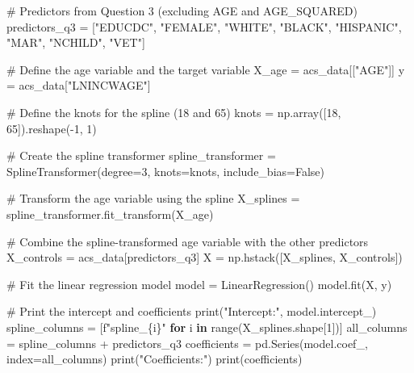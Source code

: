 \documentclass[
  11pt,
  letterpaper,
  DIV=11,
  numbers=noendperiod]{scrartcl}
\newenvironment{Shaded}{\begin{snugshade}}{\end{snugshade}}
\newcommand{\BuiltInTok}[1]{\textcolor[rgb]{0.00,0.23,0.31}{#1}}
\newcommand{\CommentTok}[1]{\textcolor[rgb]{0.37,0.37,0.37}{#1}}
\newcommand{\ControlFlowTok}[1]{\textcolor[rgb]{0.00,0.23,0.31}{\textbf{#1}}}
\newcommand{\DecValTok}[1]{\textcolor[rgb]{0.68,0.00,0.00}{#1}}
\newcommand{\KeywordTok}[1]{\textcolor[rgb]{0.00,0.23,0.31}{\textbf{#1}}}
\newcommand{\NormalTok}[1]{\textcolor[rgb]{0.00,0.23,0.31}{#1}}
\newcommand{\OperatorTok}[1]{\textcolor[rgb]{0.37,0.37,0.37}{#1}}
\newcommand{\SpecialCharTok}[1]{\textcolor[rgb]{0.37,0.37,0.37}{#1}}
\newcommand{\SpecialStringTok}[1]{\textcolor[rgb]{0.13,0.47,0.30}{#1}}
\newcommand{\StringTok}[1]{\textcolor[rgb]{0.13,0.47,0.30}{#1}}
\newcommand{\VariableTok}[1]{\textcolor[rgb]{0.07,0.07,0.07}{#1}}
\begin{document}
\begin{Shaded}
\begin{Highlighting}[]
\CommentTok{\# Predictors from Question 3 (excluding AGE and AGE\_SQUARED)}
\NormalTok{predictors\_q3 }\OperatorTok{=}\NormalTok{ [}\StringTok{"EDUCDC"}\NormalTok{, }\StringTok{"FEMALE"}\NormalTok{, }\StringTok{"WHITE"}\NormalTok{, }\StringTok{"BLACK"}\NormalTok{, }\StringTok{"HISPANIC"}\NormalTok{, }
                 \StringTok{"MAR"}\NormalTok{, }\StringTok{"NCHILD"}\NormalTok{, }\StringTok{"VET"}\NormalTok{]}

\CommentTok{\# Define the age variable and the target variable}
\NormalTok{X\_age }\OperatorTok{=}\NormalTok{ acs\_data[[}\StringTok{"AGE"}\NormalTok{]]}
\NormalTok{y }\OperatorTok{=}\NormalTok{ acs\_data[}\StringTok{"LNINCWAGE"}\NormalTok{]}

\CommentTok{\# Define the knots for the spline (18 and 65)}
\NormalTok{knots }\OperatorTok{=}\NormalTok{ np.array([}\DecValTok{18}\NormalTok{, }\DecValTok{65}\NormalTok{]).reshape(}\OperatorTok{{-}}\DecValTok{1}\NormalTok{, }\DecValTok{1}\NormalTok{)}

\CommentTok{\# Create the spline transformer}
\NormalTok{spline\_transformer }\OperatorTok{=}\NormalTok{ SplineTransformer(degree}\OperatorTok{=}\DecValTok{3}\NormalTok{, knots}\OperatorTok{=}\NormalTok{knots, include\_bias}\OperatorTok{=}\VariableTok{False}\NormalTok{)}

\CommentTok{\# Transform the age variable using the spline}
\NormalTok{X\_splines }\OperatorTok{=}\NormalTok{ spline\_transformer.fit\_transform(X\_age)}

\CommentTok{\# Combine the spline{-}transformed age variable with the other predictors}
\NormalTok{X\_controls }\OperatorTok{=}\NormalTok{ acs\_data[predictors\_q3]}
\NormalTok{X }\OperatorTok{=}\NormalTok{ np.hstack([X\_splines, X\_controls])}

\CommentTok{\# Fit the linear regression model}
\NormalTok{model }\OperatorTok{=}\NormalTok{ LinearRegression()}
\NormalTok{model.fit(X, y)}

\CommentTok{\# Print the intercept and coefficients}
\BuiltInTok{print}\NormalTok{(}\StringTok{"Intercept:"}\NormalTok{, model.intercept\_)}
\NormalTok{spline\_columns }\OperatorTok{=}\NormalTok{ [}\SpecialStringTok{f"spline\_}\SpecialCharTok{\{}\NormalTok{i}\SpecialCharTok{\}}\SpecialStringTok{"} \ControlFlowTok{for}\NormalTok{ i }\KeywordTok{in} \BuiltInTok{range}\NormalTok{(X\_splines.shape[}\DecValTok{1}\NormalTok{])]}
\NormalTok{all\_columns }\OperatorTok{=}\NormalTok{ spline\_columns }\OperatorTok{+}\NormalTok{ predictors\_q3}
\NormalTok{coefficients }\OperatorTok{=}\NormalTok{ pd.Series(model.coef\_, index}\OperatorTok{=}\NormalTok{all\_columns)}
\BuiltInTok{print}\NormalTok{(}\StringTok{"Coefficients:"}\NormalTok{)}
\BuiltInTok{print}\NormalTok{(coefficients)}


\end{Highlighting}
\end{Shaded}
\end{document}
